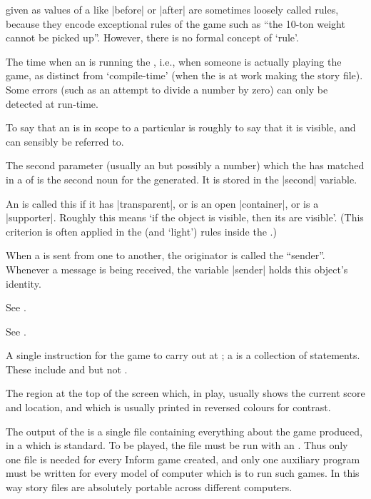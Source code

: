 %
 given as values of a  like |before| or
|after| are sometimes loosely called rules, because they encode exceptional
rules of the game such as ``the 10-ton weight cannot be picked up''. 
However, there is no formal concept of `rule'.

%
The time when an  is running the , i.e., when
someone is actually playing the game, as distinct from `compile-time' (when
the  is at work making the story file).  Some errors (such as
an attempt to divide a number by zero) can only be detected at run-time.

%
To say that an  is in scope to a particular  is
roughly to say that it is visible, and can sensibly be referred to.

%
The second parameter (usually an  but possibly a number) which the
 has matched in a  of  is the second noun for
the  generated.  It is stored in the |second| variable.

%
An  is called this if it has |transparent|, or is an open
|container|, or is a |supporter|.  Roughly this means `if the object is
visible, then its  are visible'.  (This criterion is often
applied in the  (and `light') rules inside the .)

%
When a  is sent from one  to another, the originator
is called the ``sender''.  Whenever a message is being received, the
variable |sender| holds this object's identity.

%
See .

%
See .

%
A single instruction for the game to carry out at ; a
 is a collection of statements.  These include 
and  but not .

%
The region at the top of the screen which, in play, usually shows the
current score and location, and which is usually printed in reversed colours
for contrast.

%
The output of the  is a single file containing everything about
the game produced, in a  which is standard.  To be played, the
file must be run with an .  Thus only one file is needed for
every Inform game created, and only one auxiliary program must be written
for every model of computer which is to run such games.  In this way
story files are absolutely portable across different computers.

